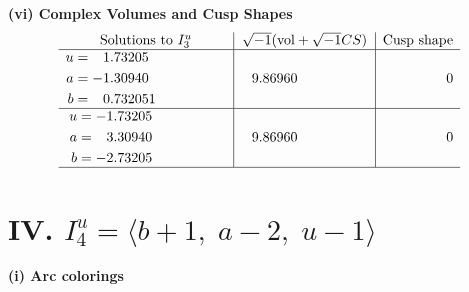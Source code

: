 \documentclass[1p]{elsarticle_modified}
\theoremstyle{definition}
\newcommand{\I}{\sqrt{-1}}
\begin{document}
\newpage\flushleft \textbf{(vi) Complex Volumes and Cusp Shapes}
$$\begin{array}{c|c|c}  
\text{Solutions to }I^u_{3}& \I (\text{vol} + \sqrt{-1}CS) & \text{Cusp shape}\\
 \hline 
\begin{aligned}
u &= \phantom{-}1.73205\phantom{ +0.000000I} \\
a &= -1.30940\phantom{ +0.000000I} \\
b &= \phantom{-}0.732051\phantom{ +0.000000I}\end{aligned}
 & \phantom{-}9.86960\phantom{ +0.000000I} & \phantom{-0.000000 } 0 \\ \hline\begin{aligned}
u &= -1.73205\phantom{ +0.000000I} \\
a &= \phantom{-}3.30940\phantom{ +0.000000I} \\
b &= -2.73205\phantom{ +0.000000I}\end{aligned}
 & \phantom{-}9.86960\phantom{ +0.000000I} & \phantom{-0.000000 } 0\\
 \hline 
 \end{array}$$\newpage\newpage\renewcommand{\arraystretch}{1}
\centering \section*{IV. $I^u_{4}= \langle b+1,\;a-2,\;u-1 \rangle$}
\flushleft \textbf{(i) Arc colorings}\\
\end{document}
